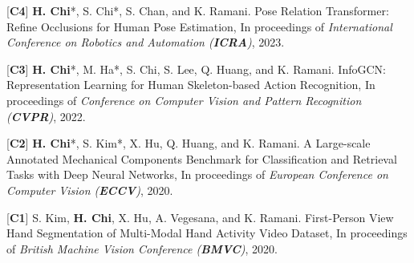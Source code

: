 \begin{cventries}
{\begin{cvitems}
    \item {[\textbf{C4}] \textbf{H. Chi}*, S. Chi*, S. Chan, and K. Ramani. Pose Relation Transformer: Refine Occlusions for Human Pose Estimation, In proceedings of \textit{International Conference on Robotics and Automation (\textbf{ICRA})}, 2023.}
    \item {[\textbf{C3}] \textbf{H. Chi}*, M. Ha*, S. Chi, S. Lee, Q. Huang, and K. Ramani. InfoGCN: Representation Learning for Human Skeleton-based Action Recognition, In proceedings of \textit{Conference on Computer Vision and Pattern Recognition (\textbf{CVPR})}, 2022.}
    \item {[\textbf{C2}] \textbf{H. Chi}*, S. Kim*, X. Hu, Q. Huang, and K. Ramani. A Large-scale Annotated Mechanical Components Benchmark for Classification and Retrieval Tasks with Deep Neural Networks, In proceedings of \textit{European Conference on Computer Vision (\textbf{ECCV})}, 2020.}
    \item {[\textbf{C1}] S. Kim, \textbf{H. Chi}, X. Hu, A. Vegesana, and K. Ramani. First-Person View Hand Segmentation of Multi-Modal Hand Activity Video Dataset, In proceedings of \textit{British Machine Vision Conference (\textbf{BMVC})}, 2020.}
\end{cvitems}
}



\end{cventries}
